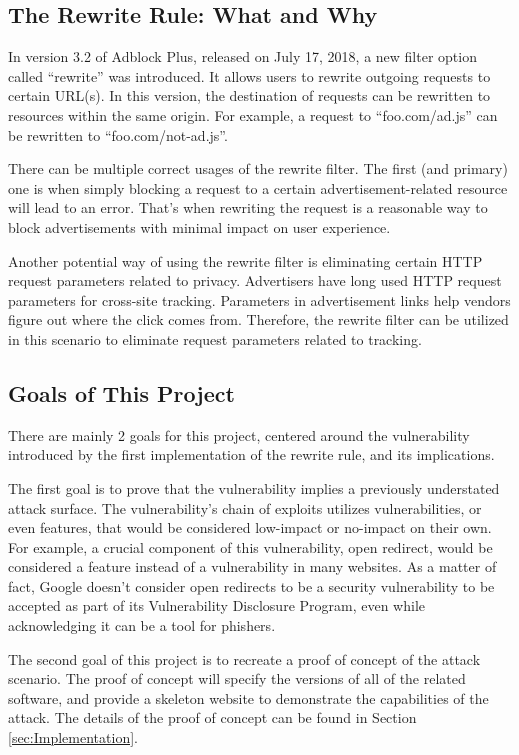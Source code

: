 \documentclass[conference]{IEEEtran}
\begin{document}
\subsection{The Rewrite Rule: What and Why}
In version 3.2 of Adblock Plus, released on July 17, 2018, a new filter option called ``rewrite'' was introduced. It allows users to rewrite outgoing requests to certain URL(s). In this version, the destination of requests can be rewritten to resources within the same origin. For example, a request to ``foo.com/ad.js'' can be rewritten to ``foo.com/not-ad.js''.

There can be multiple correct usages of the rewrite filter. The first (and primary) one is when simply blocking a request to a certain advertisement-related resource will lead to an error. That's when rewriting the request is a reasonable way to block advertisements with minimal impact on user experience.

Another potential way of using the rewrite filter is eliminating certain HTTP request parameters related to privacy. Advertisers have long used HTTP request parameters for cross-site tracking. Parameters in advertisement links help vendors figure out where the click comes from. Therefore, the rewrite filter can be utilized in this scenario to eliminate request parameters related to tracking.

\subsection{Goals of This Project}
There are mainly 2 goals for this project, centered around the vulnerability introduced by the first implementation of the rewrite rule, and its implications.

The first goal is to prove that the vulnerability implies a previously understated attack surface. The vulnerability's chain of exploits utilizes vulnerabilities, or even features, that would be considered low-impact or no-impact on their own. For example, a crucial component of this vulnerability, open redirect, would be considered a feature instead of a vulnerability in many websites. As a matter of fact, Google doesn't consider open redirects to be a security vulnerability to be accepted as part of its Vulnerability Disclosure Program, even while acknowledging it can be a tool for phishers.\cite{noauthor_open_nodate}

The second goal of this project is to recreate a proof of concept of the attack scenario. The proof of concept will specify the versions of all of the related software, and provide a skeleton website to demonstrate the capabilities of the attack. The details of the proof of concept can be found in Section \ref{sec:Implementation}.
\end{document}
